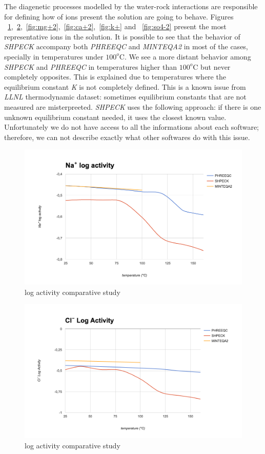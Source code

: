The diagenetic processes modelled by the water-rock interactions are responsible for defining how of ions present the solution are going to behave. Figures ~\ref{fig:na+},~\ref{fig:cl-},~\ref{fig:mg+2},~\ref{fig:ca+2},~\ref{fig:k+} and ~\ref{fig:so4-2} present the most representative ions in the solution. It is possible to see that the behavior of \emph{SHPECK} accompany both \emph{PHREEQC} and \emph{MINTEQA2} in most of the cases, specially in temperatures under $100^o$C. We see a more distant behavior among \emph{SHPECK} and \emph{PHREEQC} in temperatures higher than $100^o$C but never completely opposites. This is explained due to temperatures where the equilibrium constant \emph{K} is not completely defined. This is a known issue from \emph{LLNL} thermodynamic dataset: sometimes equilibrium constants that are not measured are misterpreeted. \emph{SHPECK} uses the following approach: if there is one unknown equilibrium constant needed, it uses the closest known value. Unfortunately we do not have access to all the informations about each software; therefore, we can not describe exactly what other softwares do with this issue.

\begin{figure}[ht!]
\centering
\includegraphics[width=140mm]{figures/na+.png}
\caption{ log activity comparative study}
\label{fig:na+}
\end{figure}

\begin{figure}[ht!]
\centering
\includegraphics[width=140mm]{figures/cl-.png}
\caption{ log activity comparative study}
\label{fig:cl-}
\end{figure}

